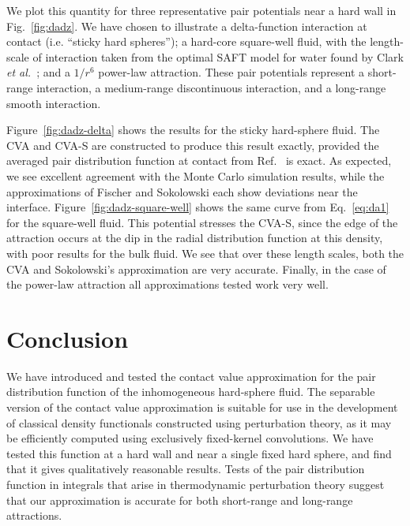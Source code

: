 \documentclass[letterpaper,twocolumn,amsmath,amssymb,pre,aps,10pt]{revtex4-1}
\begin{document}
We plot this quantity for three representative
pair potentials near a hard wall in Fig.~\ref{fig:dadz}.  We have
chosen to illustrate a delta-function interaction at contact
(i.e. ``sticky hard spheres''); a hard-core square-well fluid, with
the length-scale of interaction taken from the optimal SAFT model for
water found by Clark \emph{et al.}~\cite{clark2006developing}; and a
$1/r^6$ power-law attraction.  These pair potentials represent a
short-range interaction, a medium-range discontinuous interaction, and
a long-range smooth interaction.

Figure~\ref{fig:dadz-delta} shows the results for the sticky
hard-sphere fluid.  The CVA and CVA-S are constructed to produce this
result exactly, provided the averaged pair distribution function at
contact from Ref.~ is exact.  As expected,
we see excellent agreement with the Monte Carlo simulation results,
while the approximations of Fischer and Sokolowski each show
deviations near the interface.  Figure~\ref{fig:dadz-square-well}
shows the same curve from Eq.~\ref{eq:da1} for the square-well fluid.
This potential stresses the CVA-S, since the edge of the attraction
occurs at the dip in the radial distribution function at this density,
with poor results for the bulk fluid.  We see that over these length
scales, both the CVA and Sokolowski's approximation are very accurate.
Finally, in the case of the power-law attraction all approximations
tested work very well.

\section{Conclusion}

We have introduced and tested the contact value approximation for the pair
distribution function of the inhomogeneous hard-sphere fluid.  The
separable version of the contact value
approximation is suitable for use in the development of classical
density functionals constructed using perturbation theory, as it
may be efficiently computed using exclusively fixed-kernel convolutions.  We have
tested this function at a hard wall and near a single fixed hard
sphere, and find that it gives qualitatively reasonable results.
Tests of the pair distribution function in integrals that arise in
thermodynamic perturbation theory suggest that our approximation is
accurate for both short-range and long-range attractions.

\end{document}

